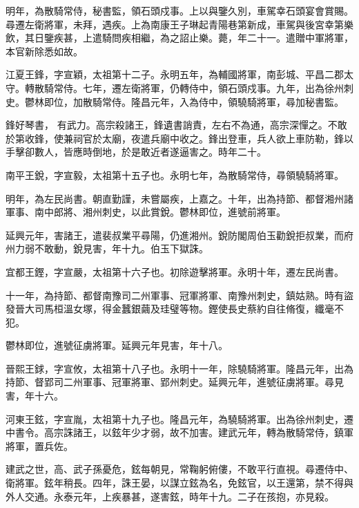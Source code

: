 \begin{pinyinscope}
 明年，為散騎常侍，秘書監，領石頭戍事。上以與鑒久別，車駕幸石頭宴會賞賜。尋遷左衛將軍，未拜，遇疾。上為南康王子琳起青陽巷第新成，車駕與後宮幸第樂飲，其日鑒疾甚，上遣騎問疾相繼，為之詔止樂。薨，年二十一。遣贈中軍將軍，本官新除悉如故。



 江夏王鋒，字宣穎，太祖第十二子。永明五年，為輔國將軍，南彭城、平昌二郡太守。轉散騎常侍。七年，遷左衛將軍，仍轉侍中，領石頭戍事。九年，出為徐州刺史。鬱林即位，加散騎常侍。隆昌元年，入為侍中，領驍騎將軍，尋加秘書監。



 鋒好琴書，
 有武力。高宗殺諸王，鋒遺書誚責，左右不為通，高宗深憚之。不敢於第收鋒，使兼祠官於太廟，夜遣兵廟中收之。鋒出登車，兵人欲上車防勒，鋒以手擊卻數人，皆應時倒地，於是敢近者遂逼害之。時年二十。



 南平王銳，字宣毅，太祖第十五子也。永明七年，為散騎常侍，尋領驍騎將軍。



 明年，為左民尚書。朝直勤謹，未嘗屬疾，上嘉之。十年，出為持節、都督湘州諸軍事、南中郎將、湘州刺史，以此賞銳。鬱林即位，進號前將軍。



 延興元年，害諸王，遣裴叔業平尋陽，仍進湘州。銳防閣周伯玉勸銳拒叔業，而府州力弱不敢動，銳見害，年十九。伯玉下獄誅。



 宜都王鏗，字宣嚴，太祖第十六子也。初除遊擊將軍。永明十年，遷左民尚書。



 十一年，為持節、都督南豫司二州軍事、冠軍將軍、南豫州刺史，鎮姑熟。時有盜發晉大司馬桓溫女塚，得金蠶銀繭及珪璧等物。鏗使長史蔡約自往脩復，纖毫不犯。



 鬱林即位，進號征虜將軍。延興元年見害，年十八。



 晉熙王銶，字宣攸，太祖第十八子也。永明十一年，除驍騎將軍。隆昌元年，出為持節、督郢司二州軍事、冠軍將軍、郢州刺史。延興元年，進號征虜將軍。尋見害，年十六。



 河東王鉉，字宣胤，太祖第十九子也。隆昌元年，為驍騎將軍。出為徐州刺史，遷中書令。高宗誅諸王，以鉉年少才弱，故不加害。建武元年，轉為散騎常侍，鎮軍將軍，置兵佐。



 建武之世，高、武子孫憂危，鉉每朝見，常鞠躬俯僂，不敢平行直視。尋遷侍中、衛將軍。鉉年稍長。四年，誅王晏，以謀立鉉為名，免鉉官，以王還第，禁不得與外人交通。永泰元年，上疾暴甚，遂害鉉，時年十九。二子在孩抱，亦見殺。




\end{pinyinscope}
